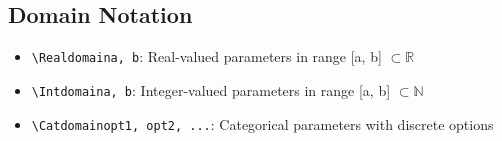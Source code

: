 \documentclass[11pt,a4paper]{article}
\begin{document}
\subsection{Domain Notation}

\begin{itemize}
\item \texttt{\textbackslash Realdomain{a, b}}: Real-valued parameters in range [a, b] $\subset \mathbb{R}$
\item \texttt{\textbackslash Intdomain{a, b}}: Integer-valued parameters in range [a, b] $\subset \mathbb{N}$
\item \texttt{\textbackslash Catdomain{opt1, opt2, ...}}: Categorical parameters with discrete options
\end{itemize}
\end{document}
